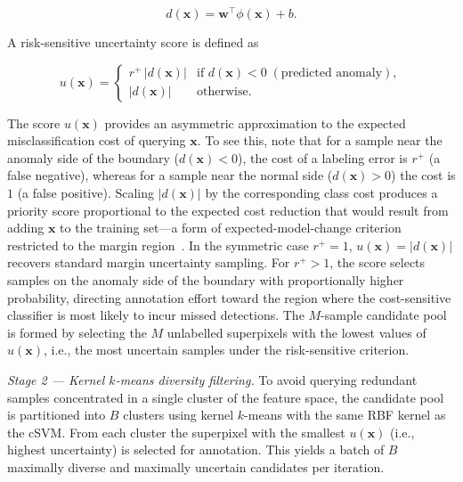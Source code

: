 \documentclass[lettersize,journal]{IEEEtran}
\begin{document}
\begin{equation}
    d(\mathbf{x}) = \mathbf{w}^{\!\top}\phi(\mathbf{x}) + b.
    \label{eq:margin}
\end{equation}

\noindent A risk-sensitive uncertainty score is defined as

\begin{equation}
    u(\mathbf{x}) =
    \begin{cases}
        r^{+}\,|d(\mathbf{x})| & \text{if } d(\mathbf{x}) < 0
                                   \;(\text{predicted anomaly}),\\
        |d(\mathbf{x})|         & \text{otherwise}.
    \end{cases}
    \label{eq:uncertainty}
\end{equation}

\noindent The score $u(\mathbf{x})$ provides an asymmetric
approximation to the expected misclassification cost of querying
$\mathbf{x}$. To see this, note that for a sample near the anomaly
side of the boundary ($d(\mathbf{x}) < 0$), the cost of a labeling
error is $r^{+}$ (a false negative), whereas for a sample near the
normal side ($d(\mathbf{x}) > 0$) the cost is $1$ (a false positive).
Scaling $|d(\mathbf{x})|$ by the corresponding class cost produces
a priority score proportional to the expected cost reduction that
would result from adding $\mathbf{x}$ to the training set---a
form of expected-model-change criterion restricted to the margin
region~\cite{settles2012active}. In the symmetric case $r^{+}=1$,
$u(\mathbf{x}) = |d(\mathbf{x})|$ recovers standard margin
uncertainty sampling. For $r^{+}>1$, the score selects samples
on the anomaly side of the boundary with proportionally higher
probability, directing annotation effort toward the region
where the cost-sensitive classifier is most likely to incur
missed detections. The $M$-sample candidate pool is formed by
selecting the $M$ unlabelled superpixels with the lowest values
of $u(\mathbf{x})$, i.e., the most uncertain samples under
the risk-sensitive criterion.

\textit{Stage 2 — Kernel $k$-means diversity filtering.}
To avoid querying redundant samples concentrated in a single cluster
of the feature space, the candidate pool is partitioned into $B$
clusters using kernel $k$-means with the same RBF kernel as the cSVM.
From each cluster the superpixel with the smallest $u(\mathbf{x})$
(i.e., highest uncertainty) is selected for annotation. This yields a
batch of $B$ maximally diverse and maximally uncertain candidates per
iteration.
\end{document}
